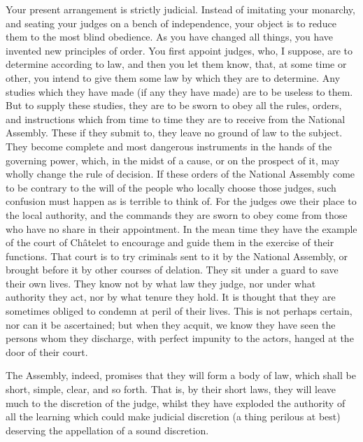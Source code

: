 Your present arrangement is strictly judicial. Instead of imitating your monarchy, and seating your judges on a bench of independence, your object is to reduce them to the most blind obedience. As you have changed all things, you have invented new principles of order. You first appoint judges, who, I suppose, are to determine according to law, and then you let them know, that, at some time or other, you intend to give them some law by which they are to determine. Any studies which they have made (if any they have made) are to be useless to them. But to supply these studies, they are to be sworn to obey all the rules, orders, and instructions which from time to time they are to receive from the National Assembly. These if they submit to, they leave no ground of law to the subject. They become complete and most dangerous instruments in the hands of the governing power, which, in the midst of a cause, or on the prospect of it, may wholly change the rule of decision. If these orders of the National Assembly come to be contrary to the will of the people who locally choose those judges, such confusion must happen as is terrible to think of. For the judges owe their place to the local authority, and the commands they are sworn to obey come from those who have no share in their appointment. In the mean time they have the example of the court of Châtelet to encourage and guide them in the exercise of their functions. That court is to try criminals sent to it by the National Assembly, or brought before it by other courses of delation. They sit under a guard to save their own lives. They know not by what law they judge, nor under what authority they act, nor by what tenure they hold. It is thought that they are sometimes obliged to condemn at peril of their lives. This is not perhaps certain, nor can it be ascertained; but when they acquit, we know they have seen the persons whom they discharge, with perfect impunity to the actors, hanged at the door of their court.

The Assembly, indeed, promises that they will form a body of law, which shall be short, simple, clear, and so forth. That is, by their short laws, they will leave much to the discretion of the judge, whilst they have exploded the authority of all the learning which could make judicial discretion (a thing perilous at best) deserving the appellation of a sound discretion.

